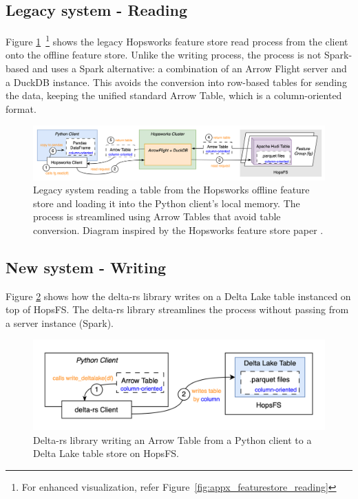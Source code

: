 \subsection{Legacy system - Reading}
\label{subsec:legacy_sys_reading}

Figure \ref{fig:featurestore_reading}~\footnote{For enhanced visualization, refer Figure~\ref{fig:appx_featurestore_reading}} shows the legacy Hopsworks feature store read process from the client onto the offline feature store. Unlike the writing process, the process is not Spark-based and uses a Spark alternative: a combination of an Arrow Flight server and a DuckDB instance. This avoids the conversion into row-based tables for sending the data, keeping the unified standard Arrow Table, which is a column-oriented format.

\begin{figure}
    \begin{center}
      \includegraphics[width=\textwidth]{figures/2-background/FeatureStore-reading.png}
    \end{center}
    \caption[Legacy system - Read process]{Legacy system reading a table from the Hopsworks offline feature store and loading it into the Python client's local memory. The process is streamlined using Arrow Tables that avoid table conversion. Diagram inspired by the Hopsworks feature store paper \cite{10.1145/3626246.3653389}.}
    \label{fig:featurestore_reading}
\end{figure}

\subsection{New system - Writing}

Figure \ref{fig:delta_rs_writing} shows how the delta-rs library writes on a Delta Lake table instanced on top of \gls{HopsFS}. The delta-rs library streamlines the process without passing from a server instance (Spark).

\begin{figure}
    \begin{center}
      \includegraphics[width=\textwidth]{figures/2-background/delta-rs_writing.png}
    \end{center}
    \caption[Delta-rs library - Write process]{Delta-rs library writing an Arrow Table from a Python client to a Delta Lake table store on \gls{HopsFS}.}
    \label{fig:delta_rs_writing}
\end{figure}

